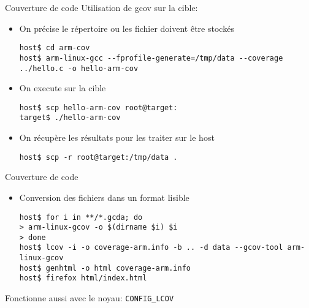 \begin{frame}[fragile=singleslide]{Couverture de code}
  Utilisation de gcov sur la cible:
  \begin{itemize} 
  \item On précise le répertoire ou les fichier doivent être stockés
    \begin{lstlisting}
host$ cd arm-cov
host$ arm-linux-gcc --fprofile-generate=/tmp/data --coverage ../hello.c -o hello-arm-cov
    \end{lstlisting} 
  \item On execute sur la cible
    \begin{lstlisting}
host$ scp hello-arm-cov root@target:
target$ ./hello-arm-cov
    \end{lstlisting} 
  \item On récupère les résultats pour les traiter sur le host
    \begin{lstlisting}
host$ scp -r root@target:/tmp/data . 
    \end{lstlisting} 
  \end{itemize}
\end{frame}

\begin{frame}[fragile=singleslide]{Couverture de code}
  \begin{itemize}
  \item Conversion des fichiers   dans un format lisible
    \begin{lstlisting}
host$ for i in **/*.gcda; do
> arm-linux-gcov -o $(dirname $i) $i
> done
host$ lcov -i -o coverage-arm.info -b .. -d data --gcov-tool arm-linux-gcov
host$ genhtml -o html coverage-arm.info
host$ firefox html/index.html
    \end{lstlisting} 
  \end{itemize}
  Fonctionne aussi avec le noyau: \texttt{CONFIG\_LCOV}
 
\end{frame}

